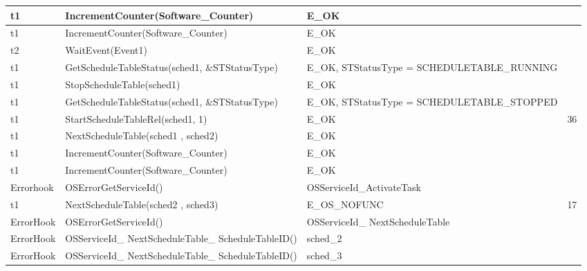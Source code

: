 \documentclass[10pt]{article}
\newlength{\Li}\settowidth{\Li}{Running}
\newlength{\Lii}\setlength{\Lii}{7cm}
\newlength{\Liiii}\setlength{\Liiii}{0.9cm}
\newlength{\Liii}\setlength{\Liii}{\textwidth} \addtolength{\Liii}{-\Li} \addtolength{\Liii}{-\Lii} \addtolength{\Liii}{-\Liiii}
\begin{document}
\begin{supertabular}{|p{\Li}|p{\Lii}|p{\Liii}|p{\Liiii}|}
	t1		& IncrementCounter(Software\_Counter)										& E\_OK												& \\ \hline
	t1		& IncrementCounter(Software\_Counter)										& E\_OK												& \\ \hline
	
	t2		& WaitEvent(Event1)														& E\_OK												& \\ \hline

	t1		& GetScheduleTableStatus(sched1, \&STStatusType)							& E\_OK, STStatusType = SCHEDULETABLE\_RUNNING		& \\ \hline
	t1		& StopScheduleTable(sched1)												& E\_OK												&  \\ \hline
	t1		& GetScheduleTableStatus(sched1, \&STStatusType)							& E\_OK, STStatusType = SCHEDULETABLE\_STOPPED		& \\ \hline

	t1		& StartScheduleTableRel(sched1, 1)										& E\_OK												& 36 \\ \hline
	t1		& NextScheduleTable(sched1 , sched2)										& E\_OK												& \\ \hline
	t1		& IncrementCounter(Software\_Counter)										& E\_OK												& \\ \hline
	t1		& IncrementCounter(Software\_Counter)										& E\_OK												& \\ \hline
	Errorhook	& OSErrorGetServiceId()													& OSServiceId\_ActivateTask								& \\ \hline
	t1		& NextScheduleTable(sched2 , sched3)										& E\_OS\_NOFUNC										& 17 \\ \hline
	ErrorHook	& OSErrorGetServiceId()													& OSServiceId\_ NextScheduleTable						& \\ \hline
	ErrorHook	& OSServiceId\_ NextScheduleTable\_ ScheduleTableID()						& sched\_2											& \\ \hline
	ErrorHook	& OSServiceId\_ NextScheduleTable\_ ScheduleTableID()						& sched\_3											& \\ \hline
	

\end{supertabular}
\end{document}
